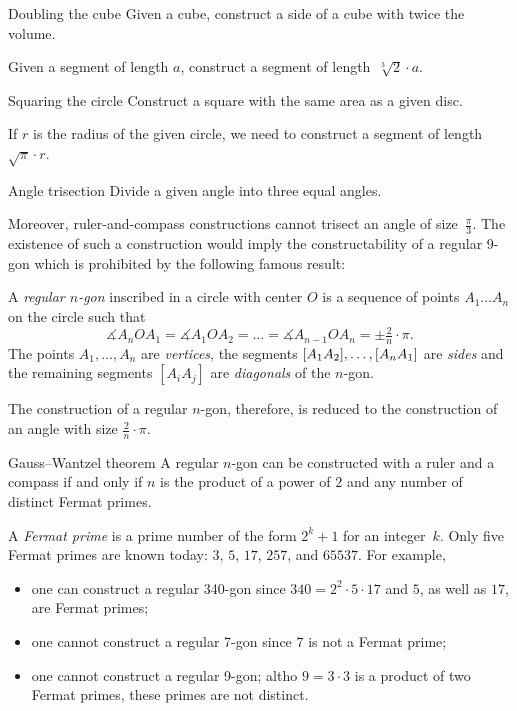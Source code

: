 \begin{thm*}{Doubling the cube}
Given a cube, construct a side of a cube with twice the volume.
\end{thm*}

Given a segment of length $a$,
construct a segment of length~$\sqrt[3]{2}\cdot a$.

\begin{thm*}{Squaring the circle}
Construct a square with the same area as a given disc.
\end{thm*}

If $r$ is the radius of the given circle, we need to construct a segment of length~$\sqrt{\pi}\cdot r$. 

\begin{thm*}{Angle trisection} 
Divide a given angle into three equal angles.
\end{thm*}

Moreover, ruler-and-compass constructions cannot trisect an angle of size~$\tfrac\pi3$. 
The existence of such a construction would imply the constructability of a regular 9-gon which is prohibited by the following famous result:

A \emph{regular $n$-gon} inscribed in a circle with center $O$ is a sequence of points $A_1\dots A_n$ on the circle such that 
\[\measuredangle A_nOA_1=\measuredangle A_1OA_2=\dots=\measuredangle A_{n-1}OA_n=\pm\tfrac2n\cdot \pi.\]
The points $A_1,\dots, A_n$ are \emph{vertices},
the segments $[A_1A_2], \dots, [A_nA_1]$ are \emph{sides} 
and the remaining segments $[A_iA_j]$ are \emph{diagonals} of the $n$-gon.

The construction of a regular $n$-gon, therefore, is reduced to the construction of an angle with size $\tfrac2n\cdot \pi$.

\begin{thm}{Gauss--Wantzel theorem}
A regular $n$-gon can be constructed with a ruler and a compass 
if and only if 
$n$ is the product of a power of $2$ and any number of distinct Fermat primes.
\end{thm}

A \emph{Fermat prime} is a prime number of the form $2^k+1$ for an integer~$k$.
Only five Fermat primes are known  today: $3$, $5$, $17$, $257$, and $65537$.
For example, 
\begin{itemize}
\item one can construct a regular 340-gon since $340=2^2\cdot 5\cdot 17$ and $5$, as well as $17$, are Fermat primes;
\item one cannot construct a regular 7-gon since $7$ is not a Fermat prime;
\item one cannot construct a regular 9-gon; 
altho $9=3\cdot 3$ is a product of two Fermat primes, 
these primes are not distinct.
\end{itemize}

